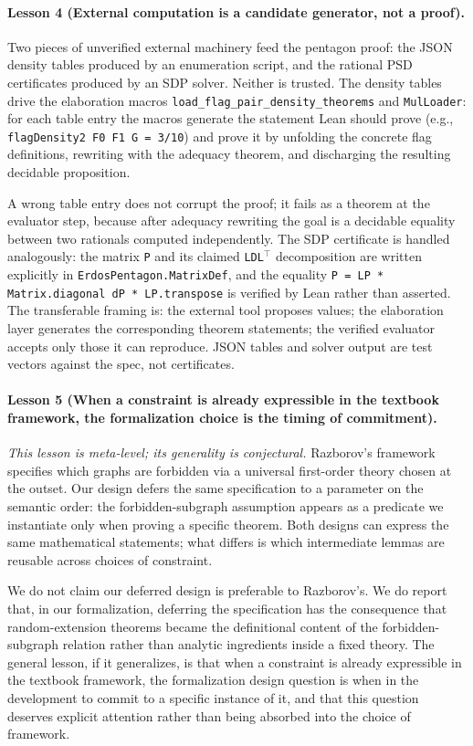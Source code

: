 \documentclass{article}
\newcommand{\lean}[1]{\texttt{#1}}
\begin{document}
\paragraph{Lesson 4 (External computation is a candidate generator, not a
proof).}
Two pieces of unverified external machinery feed the pentagon proof: the
JSON density tables produced by an enumeration script, and the rational PSD
certificates produced by an SDP solver.  Neither is trusted.  The density
tables drive the elaboration macros \lean{load\_flag\_pair\_density\_theorems}
and \lean{MulLoader}: for each table entry the macros generate the
statement Lean should prove (e.g., \lean{flagDensity2 F0 F1 G = 3/10}) and
prove it by unfolding the concrete flag definitions, rewriting with the
adequacy theorem, and discharging the resulting decidable proposition.

A wrong table entry does not corrupt the proof; it fails as a theorem at the
evaluator step, because after adequacy rewriting the goal is a decidable
equality between two rationals computed independently.  The SDP certificate
is handled analogously: the matrix \lean{P} and its claimed
\lean{LDL$^\top$} decomposition are written explicitly in
\lean{ErdosPentagon.MatrixDef}, and the equality \lean{P = LP * Matrix.diagonal dP * LP.transpose}
is verified by Lean rather than asserted.  The transferable framing is: the
external tool proposes values; the elaboration layer generates the
corresponding theorem statements; the verified evaluator accepts only those
it can reproduce.  JSON tables and solver output are test vectors against
the spec, not certificates.

\paragraph{Lesson 5 (When a constraint is already expressible in the
textbook framework, the formalization choice is the timing of commitment).}
\emph{This lesson is meta-level; its generality is conjectural.}
Razborov's framework specifies which graphs are forbidden via a universal
first-order theory chosen at the outset.  Our design defers the same
specification to a parameter on the semantic order: the forbidden-subgraph
assumption appears as a predicate we instantiate only when proving a
specific theorem.  Both designs can express the same mathematical
statements; what differs is which intermediate lemmas are reusable across
choices of constraint.

We do not claim our deferred design is preferable to Razborov's.  We do
report that, in our formalization, deferring the specification has the
consequence that random-extension theorems became the definitional content
of the forbidden-subgraph relation rather than analytic ingredients inside
a fixed theory.  The general lesson, if it generalizes, is that when a
constraint is already expressible in the textbook framework, the
formalization design question is when in the development to commit to a
specific instance of it, and that this question deserves explicit attention
rather than being absorbed into the choice of framework.
\end{document}
